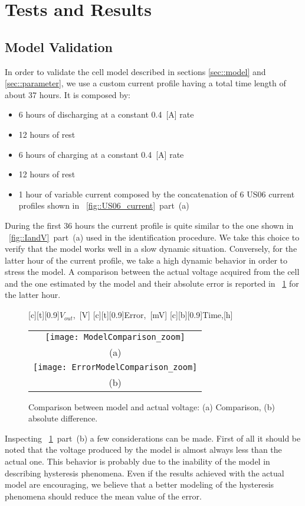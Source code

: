 \documentclass[journal]{IEEEtran}
\begin{document}
\section{Tests and Results}
\label{sec::results} 
\subsection{Model Validation}
In order to validate the cell model described in sections \ref{sec::model} and \ref{sec::parameter}, we use a custom current profile having a total time length of about 37 hours. It is composed by:
\begin{itemize}
\item 6 hours of discharging at a constant 0.4~[A] rate
\item 12 hours of rest
\item 6 hours of charging at a constant 0.4~[A] rate
\item 12 hours of rest
\item 1 hour of variable current composed by the concatenation of 6 US06 current profiles shown in \figurename~\ref{fig::US06_current}~part~(a)
\end{itemize}
During the first 36 hours the current profile is quite similar to the one shown in \figurename~\ref{fig::IandV}~part~(a) used in the identification procedure. We take this choice to verify that the model works well in a slow dynamic situation. Conversely, for the latter hour of the current profile, we take a high dynamic behavior in order to stress the model.
A comparison between the actual voltage acquired from the cell and the one estimated by the model and their absolute error is reported in \figurename~\ref{fig::voltage_comparison} for the latter hour.
\begin{figure}[htbph]
\centering
    [c][t][0.9]{\scriptsize{$V_{out}$,~[V]}}
    [c][t][0.9]{\scriptsize{Error,~[mV]}}
    [c][b][0.9]{\scriptsize{Time,[h]}}
\begin{tabular}{c}
\texttt{[image: ModelComparison\_zoom]} \\ 
(a)\\
\texttt{[image: ErrorModelComparison\_zoom]} \\
(b)\\
\end{tabular}
\caption{Comparison between model and actual voltage: (a) Comparison, (b) absolute difference.}
\label{fig::voltage_comparison}    
\end{figure}
Inspecting \figurename~\ref{fig::voltage_comparison}~part~(b) a few considerations can be made. 
First of all it should be noted that the voltage produced by the model is almost always less than the actual one. This behavior is probably due to the inability of the model in describing hysteresis phenomena. Even if the results achieved with the actual model are encouraging, we believe that a better modeling of the hysteresis phenomena should reduce the mean value of the error. 
\end{document}
